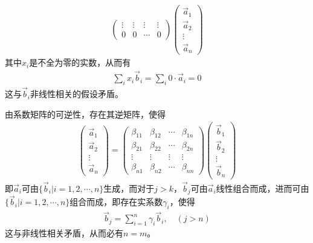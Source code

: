 \begin{example}
\begin{align*}
\begin{pmatrix}
      \vdots     & \vdots     & \vdots& \vdots     \\
      0          & 0 & \cdots & 0
    \end{pmatrix}
    \begin{pmatrix}\vec a_1 \\ \vec a_2 \\ \vdots \\ \vec a_n\end{pmatrix}
  \end{align*}
  其中$x_i$是不全为零的实数，从而有
  \begin{align*}
    \sum_i x_i\vec b_i = \sum_i 0\cdot\vec a_i = 0
  \end{align*}
  这与$\vec b_i$非线性相关的假设矛盾。

  由系数矩阵的可逆性，存在其逆矩阵，使得
  \begin{align*}
    \begin{pmatrix}\vec a_1 \\ \vec a_2 \\ \vdots \\ \vec a_n\end{pmatrix}=
    \begin{pmatrix}
      \beta_{11} & \beta_{12} & \cdots & \beta_{1n}\\
      \beta_{21} & \beta_{22} & \cdots & \beta_{2n}\\
      \vdots     & \vdots     & \vdots & \vdots    \\
      \beta_{n1} & \beta_{n2} & \cdots & \beta_{nn}
    \end{pmatrix}
    \begin{pmatrix}\vec b_1 \\ \vec b_2 \\ \vdots \\ \vec b_n\end{pmatrix}
  \end{align*}
  即$\vec a_i$可由$\{\vec b_i|i=1,2,\cdots,n\}$生成，而对于$j>k$，$\vec b_j$可由$\vec a_i$线性组合而成，进而可由$\{\vec b_i|i=1,2,\cdots,n\}$组合而成，即存在实系数$\gamma_i$，使得
  \begin{align*}
    \vec b_j = \sum_{i=1}^n \gamma_i \vec b_i,\quad(j>n)
  \end{align*}
  这与非线性相关矛盾，从而必有$n=m$。
\end{example}


